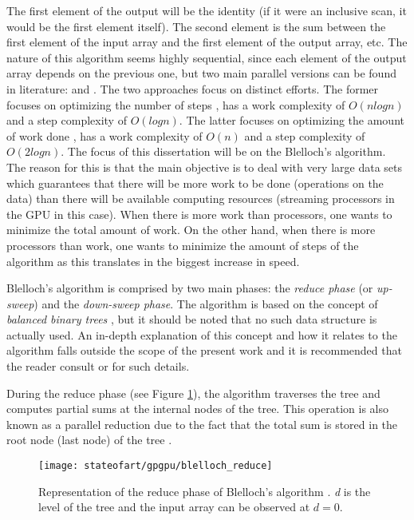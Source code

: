 The first element of the output will be the identity (if it were an inclusive scan, it would be the first element itself).
The second element is the sum between the first element of the input array and the first element of the output array, etc.
The nature of this algorithm seems highly sequential, since each element of the output array depends on the previous one, but two main parallel versions can be found in literature: \citet{Hillis1986} and \citet{Blelloch1990}. 
The two approaches focus on distinct efforts.
The former focuses on optimizing the number of steps \cite{Hillis1986}, has a work complexity of $O(nlogn)$ and a step complexity of $O(logn)$.
The latter focuses on optimizing the amount of work done \cite{Blelloch1990}, has a work complexity of $O(n)$ and a step complexity of $O(2logn)$.
The focus of this dissertation will be on the Blelloch's algorithm.
The reason for this is that the main objective is to deal with very large data sets which guarantees that there will be more work to be done (operations on the data) than there will be available computing resources (streaming processors in the GPU in this case).
When there is more work than processors, one wants to minimize the total amount of work.
On the other hand, when there is more processors than work, one wants to minimize the amount of steps of the algorithm as this translates in the biggest increase in speed.



Blelloch's algorithm is comprised by two main phases: the \emph{reduce phase} (or \emph{up-sweep}) and the \emph{down-sweep phase}.
The algorithm is based on the concept of \emph{balanced binary trees} \cite{Harris2007}, but it should be noted that no such data structure is actually used.
An in-depth explanation of this concept and how it relates to the algorithm falls outside the scope of the present work and it is recommended that the reader consult \cite{Harris2007} or \cite{Blelloch1990} for such details.

During the reduce phase (see Figure \ref{fig:scan reduce}), the algorithm traverses the tree and computes partial sums at the internal nodes of the tree.
This operation is also known as a parallel reduction due to the fact that the total sum is stored in the root node (last node) of the tree \cite{Harris2007}.

\begin{figure}[hbtp]
\centering
\texttt{[image: stateofart/gpgpu/blelloch\_reduce]}
\caption{Representation of the reduce phase of Blelloch's algorithm \cite{Harris2007}. \emph{d} is the level of the tree and the input array can be observed at $d=0$.}
\label{fig:scan reduce}
\end{figure}

